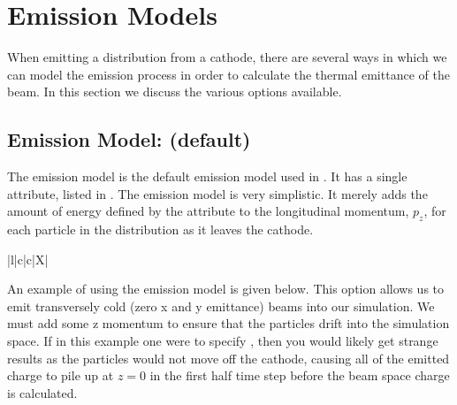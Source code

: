 \section{Emission Models}
\label{sec:emissionmodel}
\FloatBarrier

When emitting a distribution from a cathode, there are several ways in which we can model the emission process in order
to calculate the thermal emittance of the beam. In this section we discuss the various options available.

\subsection{Emission Model:  (default)}
The emission model  is the default emission model used in \opalt. It has a single attribute, listed in
. The  emission model is very simplistic. It merely adds the amount
of energy defined by the attribute  to the longitudinal momentum, $p_{z}$, for each particle in the distribution
as it leaves the cathode.

\begin{table}[!htb]
  \begin{center}\footnotesize
    \caption{Attributes for the  and  emission models.}
    \label{tab:distattremitmodelnoneastra}
    \begin{tabularx}{\textwidth-1cm}{|l|c|c|X|}
      \hline
      \hline
      \hline
    \end{tabularx}
  \end{center}
\end{table}

An example of using the  emission model is given below. This option allows us to emit transversely cold
(zero x and y emittance) beams into our simulation. We must add some z momentum to ensure that the particles drift into
the simulation space. If in this example one were to specify , then you would likely get strange results
as the particles would not move off the cathode, causing all of the emitted charge to pile up at $z = 0$ in the first half
time step before the beam space charge is calculated.


